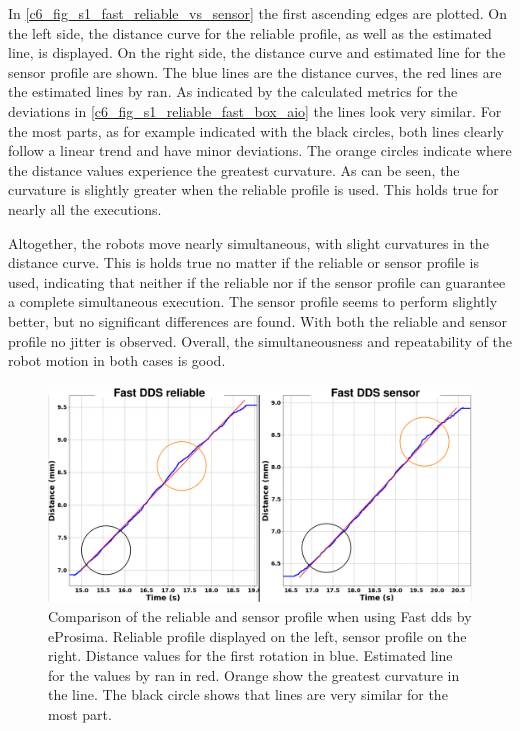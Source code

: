 In \autoref{c6_fig_s1_fast_reliable_vs_sensor} the first ascending edges are plotted. On the left side, the distance curve for the reliable profile, as well as the estimated line, is displayed. On the right side, the distance curve and estimated line for the sensor profile are shown. The blue lines are the distance curves, the red lines are the estimated lines by \gls{ran}. As indicated by the calculated metrics for the deviations in \autoref{c6_fig_s1_reliable_fast_box_aio} the lines look very similar. For the most parts, as for example indicated with the black circles, both lines clearly follow a linear trend and have minor deviations. The orange circles indicate where the distance values experience the greatest curvature. As can be seen, the curvature is slightly greater when the reliable profile is used. This holds true for nearly all the executions.


Altogether, the robots move nearly simultaneous, with slight curvatures in the distance curve. This is holds true no matter if the reliable or sensor profile is used, indicating that neither if the reliable nor if the sensor profile can guarantee a complete simultaneous execution. The sensor profile seems to perform slightly better, but no significant differences are found. With both the reliable and sensor profile no jitter is observed. Overall, the simultaneousness and repeatability of the robot motion in both cases is good.
\begin{figure}[hhtpb]
	\centering
	\includegraphics[width=1\textwidth]{Figures/c6/s1/s1_fast_dds_reliable_vs_sensor.png}
	\caption{Comparison of the reliable and sensor profile when using Fast \gls{dds} by eProsima. Reliable profile displayed on the left, sensor profile on the right. Distance values for the first rotation in blue. Estimated line for the values by \gls{ran} in red. Orange show the greatest curvature in the line. The black circle shows that lines are very similar for the most part.}
	\label{c6_fig_s1_fast_reliable_vs_sensor}
\end{figure}

